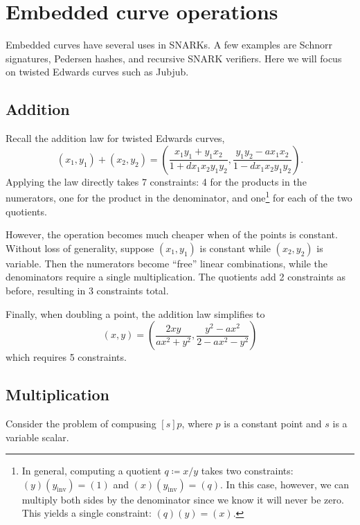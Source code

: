\documentclass{article}
\begin{document}
\section{Embedded curve operations}

Embedded curves have several uses in SNARKs. A few examples are Schnorr signatures, Pedersen hashes, and recursive SNARK verifiers.
Here we will focus on twisted Edwards curves such as Jubjub.


\subsection{Addition}

Recall the addition law for twisted Edwards curves,
\begin{equation}
  (x_1, y_1) + (x_2, y_2) = \left( \frac{x_1 y_1 + y_1 x_2}{1 + d x_1 x_2 y_1 y_2}, \frac{y_1 y_2 - a x_1 x_2}{1 - d x_1 x_2 y_1 y_2} \right).
\end{equation}
Applying the law directly takes 7 constraints: 4 for the products in the numerators, one for the product in the denominator, and one\footnote{In general, computing a quotient $q \coloneqq x / y$ takes two constraints: $(y) (y_\mathrm{inv}) = (1)$ and $(x) (y_\mathrm{inv}) = (q)$. In this case, however, we can multiply both sides by the denominator since we know it will never be zero. This yields a single constraint: $(q) (y) = (x)$.} for each of the two quotients.

However, the operation becomes much cheaper when of the points is constant. Without loss of generality, suppose $(x_1, y_1)$ is constant while $(x_2, y_2)$ is variable. Then the numerators become ``free'' linear combinations, while the denominators require a single multiplication. The quotients add 2 constraints as before, resulting in 3 constraints total.

Finally, when doubling a point, the addition law simplifies to
\begin{equation}
  [2] (x, y) = \left( \frac{2 x y}{a x^2 + y^2}, \frac{y^2 - a x^2}{2 - a x^2 - y^2} \right)
\end{equation}
which requires 5 constraints.


\subsection{Multiplication}

Consider the problem of compusing $[s] p$, where $p$ is a constant point and $s$ is a variable scalar.
\end{document}
